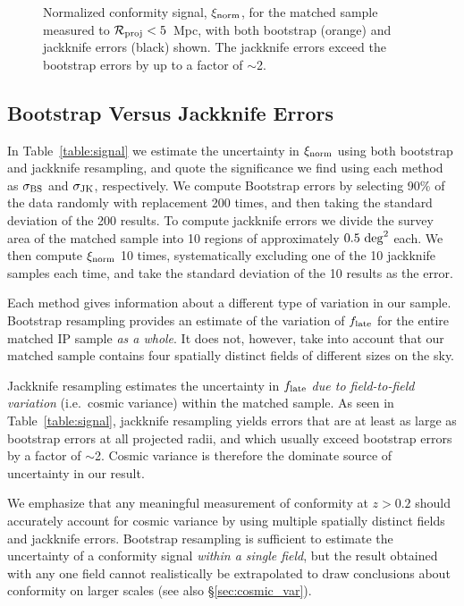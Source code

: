 \begin{figure}
  \epstrim{0.3in 0.1in 0.2in 0.3in}
  \caption{Normalized conformity signal, $\signorm$, for the matched sample measured to ${\mathcal{R}_{\text{proj}}<5}$~Mpc, with both bootstrap (orange) and jackknife errors (black) shown.  The jackknife errors exceed the bootstrap errors by up to a factor of $\sim$2.
}
  \label{fig:normsig_matched}
\end{figure}


\subsection{Bootstrap Versus Jackknife Errors}\label{sec:errors}

In Table~\ref{table:signal} we estimate the uncertainty in $\signorm$ using both bootstrap and jackknife resampling, and quote the significance we find using each 
method as $\sigmaBS$ and $\sigmaJK$, respectively.
We compute Bootstrap errors by selecting 90\% of the data randomly with replacement 200 times, and then taking the standard deviation of the 200 results.
To compute jackknife errors we divide the survey area of the matched sample into 10 regions of approximately $0.5~\degsq$ each.
We then compute $\signorm$ 10 times, systematically excluding one of the 10 jackknife samples each time, and take the standard deviation of the 10 results as the error.

Each method gives information about a different type of variation in our sample.
Bootstrap resampling provides an estimate of the variation of $\flate$ for the entire matched IP sample \emph{as a whole}.
It does not, however, take into account that our matched sample contains four spatially distinct fields of different sizes on the sky.

Jackknife resampling estimates the uncertainty in $\flate$ \emph{due to field-to-field variation} (i.e.~cosmic variance) within the matched sample.
As seen in Table~\ref{table:signal}, jackknife resampling yields errors that are at least as large as bootstrap errors at all projected radii,
and which usually exceed bootstrap errors by a factor of $\sim$2.
Cosmic variance is therefore the dominate source of uncertainty in our result.

We emphasize that any meaningful measurement of conformity at $z>0.2$ should accurately account for cosmic variance by using multiple spatially distinct fields and jackknife errors.
Bootstrap resampling is sufficient to estimate the uncertainty of a conformity signal \emph{within a single field}, but the result obtained with any one field cannot
realistically be extrapolated to draw conclusions about conformity on larger scales (see also \S\ref{sec:cosmic_var}).

